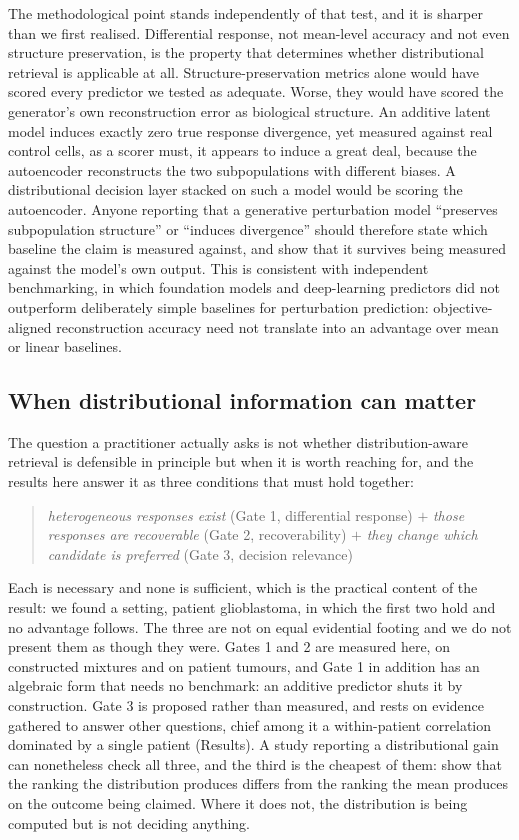 \documentclass[11pt,letterpaper]{article}
\begin{document}
The methodological point stands independently of that test, and it is sharper than we first
realised. Differential response, not mean-level accuracy and not even structure preservation, is the
property that determines whether distributional retrieval is applicable at all. Structure-preservation
metrics alone would have scored every predictor we tested as adequate. Worse, they would have
scored the generator's own reconstruction error as biological structure. An additive latent model
induces exactly zero true response divergence, yet measured against real control cells, as a scorer
must, it appears to induce a great deal, because the autoencoder reconstructs the two subpopulations
with different biases. A distributional decision layer stacked on such a model would be scoring the
autoencoder. Anyone reporting that a generative perturbation model ``preserves subpopulation
structure'' or ``induces divergence'' should therefore state which baseline the claim is measured
against, and show that it survives being measured against the model's own output. This
is consistent with independent benchmarking, in which foundation models and deep-learning
predictors did not outperform deliberately simple baselines for perturbation
prediction\cite{ref13,ref14}: objective-aligned reconstruction accuracy need not translate into an
advantage over mean or linear baselines.

\subsection*{When distributional information can matter}

The question a practitioner actually asks is not whether distribution-aware retrieval is
defensible in principle but when it is worth reaching for, and the results here answer it as three
conditions that must hold together:

\begin{quote}
\emph{heterogeneous responses exist} (Gate 1, differential response) $+$
\emph{those responses are recoverable} (Gate 2, recoverability) $+$
\emph{they change which candidate is preferred} (Gate 3, decision relevance)
\end{quote}

\noindent Each is necessary and none is sufficient, which is the practical content of the result:
we found a setting, patient glioblastoma, in which the first two hold and no advantage follows.
The three are not on equal evidential footing and we do not present them as though they were.
Gates 1 and 2 are measured here, on constructed mixtures and on patient tumours, and Gate 1 in
addition has an algebraic form that needs no benchmark: an additive predictor shuts it by
construction. Gate 3 is proposed rather than measured, and rests on evidence gathered to answer
other questions, chief among it a within-patient correlation dominated by a single patient
(Results). A study reporting a distributional gain can nonetheless check all three, and the third
is the cheapest of them: show that the ranking the distribution produces differs from the ranking
the mean produces on the outcome being claimed. Where it does not, the distribution is being
computed but is not deciding anything.
\end{document}
